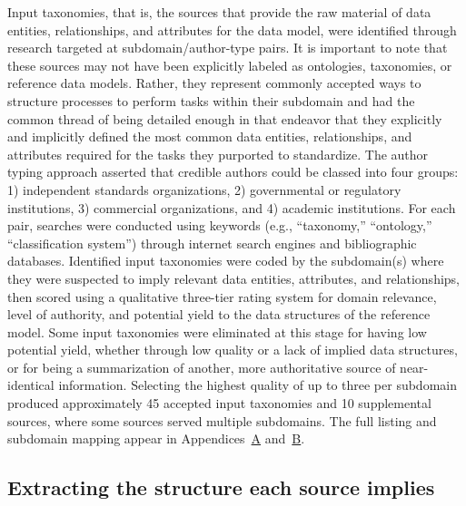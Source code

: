 \documentclass[10pt,letterpaper,twocolumn,twoside]{rho-class/rho}
\begin{document}
Input taxonomies, that is, the sources that provide the raw material of data entities, relationships, and attributes for the data model, were identified through research targeted at subdomain/author-type pairs. It is important to note that these sources may not have been explicitly labeled as ontologies, taxonomies, or reference data models. Rather, they represent commonly accepted ways to structure processes to perform tasks within their subdomain and had the common thread of being detailed enough in that endeavor that they explicitly and implicitly defined the most common data entities, relationships, and attributes required for the tasks they purported to standardize. The author typing approach asserted that credible authors could be classed into four groups: 1) independent standards organizations, 2) governmental or regulatory institutions, 3) commercial organizations, and 4) academic institutions. For each pair, searches were conducted using keywords (e.g., ``taxonomy,'' ``ontology,'' ``classification system'') through internet search engines and bibliographic databases. Identified input taxonomies were coded by the subdomain(s) where they were suspected to imply relevant data entities, attributes, and relationships, then scored using a qualitative three-tier rating system for domain relevance, level of authority, and potential yield to the data structures of the reference model. Some input taxonomies were eliminated at this stage for having low potential yield, whether through low quality or a lack of implied data structures, or for being a summarization of another, more authoritative source of near-identical information. Selecting the highest quality of up to three per subdomain produced approximately 45 accepted input taxonomies and 10 supplemental sources, where some sources served multiple subdomains. The full listing and subdomain mapping appear in Appendices~\hyperref[app:a]{A} and~\hyperref[app:b]{B}.

\subsection{Extracting the structure each source implies}\label{sec:extraction}
\end{document}
